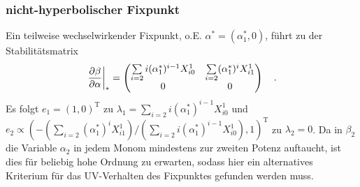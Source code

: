     \subsubsection{nicht-hyperbolischer Fixpunkt}
	 Ein teilweise wechselwirkender Fixpunkt, o.E. $\alpha^*=(\alpha_1^*,0)$,  
	 führt zu der Stabilitätsmatrix 
	 \begin{equation}
	 \left.\frac{\partial \beta}{\partial \alpha}\right|_* = \begin{pmatrix}
	          \sum\limits_{i=2}i (\alpha_1^*)^{i-1}  X^1_{i0} &
	          \sum\limits_{i=2} (\alpha_1^*)^i  X^1_{i1}\\
	          0&
	          0
	         \end{pmatrix} \quad . \label{eq:beta_im_R2:stab_matrix_0}
	 \end{equation}
	 Es folgt $e_1=(1,0)^\text{T}$ zu $\lambda_1 = \sum_{i=2}i 
	 (\alpha_1^*)^{i-1}  X^1_{i0}$ und $e_2\propto(-(\sum_{i=2} (\alpha_1^*)^i  
	 X^1_{i1} )/(\sum_{i=2}i (\alpha_1^*)^{i-1}  X^1_{i0}) ,1)^\text{T}$ 
	 zu $\lambda_2=0$. Da in $\beta_2$ die Variable $\alpha_2$ in jedem Monom  
	 mindestens zur zweiten Potenz auftaucht, ist dies für 
	 beliebig hohe Ordnung zu erwarten, sodass hier ein alternatives Kriterium 
	 für das UV-Verhalten des Fixpunktes gefunden werden muss.  


